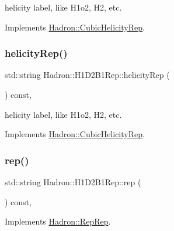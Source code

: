helicity label, like H1o2, H2, etc. 

Implements \mbox{\hyperlink{structHadron_1_1CubicHelicityRep_af1096946b7470edf0a55451cc662f231}{Hadron\+::\+Cubic\+Helicity\+Rep}}.

\mbox{\label{structHadron_1_1H1D2B1Rep_ac8a7ff273c48151c27ea9e299bc99715}} 
\subsubsection{\texorpdfstring{helicityRep()}{helicityRep()}\hspace{0.1cm}{\footnotesize\ttfamily [3/3]}}
{\footnotesize\ttfamily std\+::string Hadron\+::\+H1\+D2\+B1\+Rep\+::helicity\+Rep (\begin{DoxyParamCaption}{ }\end{DoxyParamCaption}) const\hspace{0.3cm}{\ttfamily [inline]}, {\ttfamily [virtual]}}

helicity label, like H1o2, H2, etc. 

Implements \mbox{\hyperlink{structHadron_1_1CubicHelicityRep_af1096946b7470edf0a55451cc662f231}{Hadron\+::\+Cubic\+Helicity\+Rep}}.

\mbox{\label{structHadron_1_1H1D2B1Rep_a4728e19334216fe0a85733f3356d8716}} 
\subsubsection{\texorpdfstring{rep()}{rep()}\hspace{0.1cm}{\footnotesize\ttfamily [1/5]}}
{\footnotesize\ttfamily std\+::string Hadron\+::\+H1\+D2\+B1\+Rep\+::rep (\begin{DoxyParamCaption}{ }\end{DoxyParamCaption}) const\hspace{0.3cm}{\ttfamily [inline]}, {\ttfamily [virtual]}}



Implements \mbox{\hyperlink{structHadron_1_1RepRep_ab3213025f6de249f7095892109575fde}{Hadron\+::\+Rep\+Rep}}.

\mbox{\label{structHadron_1_1H1D2B1Rep_a4728e19334216fe0a85733f3356d8716}} 
